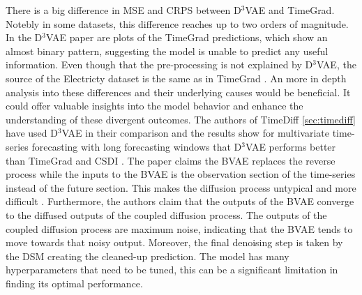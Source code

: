 There is a big difference in MSE and CRPS between D$^3$VAE and TimeGrad. Notebly in some datasets, this difference reaches up to two orders of magnitude. In the D$^3$VAE paper are plots of the TimeGrad predictions, which show an almost binary pattern, suggesting the model is unable to predict any useful information. Even though that the pre-processing is not explained by D$^3$VAE, the source of the Electricty dataset is the same as in TimeGrad \cite{rasul_autoregressive_2021}. An more in depth analysis into these differences and their underlying causes would be beneficial. It could offer valuable insights into the model behavior and enhance the understanding of these divergent outcomes.
The authors of TimeDiff \ref{sec:timediff} have used D$^3$VAE in their comparison and the results show for multivariate time-series forecasting with long forecasting windows that D$^3$VAE performs better than TimeGrad and CSDI \cite{shen_non-autoregressive_2023}.
The paper claims the BVAE replaces the reverse process while the inputs to the BVAE is the observation section of the time-series instead of the future section. This makes the diffusion process untypical and more difficult \cite{shen_non-autoregressive_2023}. Furthermore, the authors claim that the outputs of the BVAE converge to the diffused outputs of the coupled diffusion process. The outputs of the coupled diffusion process are maximum noise, indicating that the BVAE tends to move towards that noisy output. Moreover, the final denoising step is taken by the DSM creating the cleaned-up prediction.
The model has many hyperparameters that need to be tuned, this can be a significant limitation in finding its optimal performance.